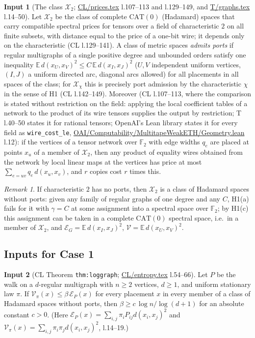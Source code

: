 \documentclass[11pt]{article}
\theoremstyle{definition}
\newtheorem{hyp}{Input}
\theoremstyle{remark}
\newtheorem{remark}[theorem]{Remark}
\newcommand{\F}{\mathbb F}
\newcommand{\E}{\mathbb E}
\newcommand{\X}{\mathcal X}
\newcommand{\src}[1]{\url{#1}}
\begin{document}
\begin{hyp}[The class $\X_2$; \src{CL/prices.tex} l.107--113 and l.129--149, and \src{T/graphs.tex} l.14--50]\label{H2}
Let $\X_2$ be the class of complete $\mathrm{CAT}(0)$ (Hadamard) spaces that carry compatible spectral prices for tensors over a
field of characteristic $2$ on all finite subsets, with distance equal to the price of a one-bit wire; it depends only on the
characteristic (CL l.129--141). A class of metric spaces \emph{admits ports} if regular multigraphs of a single positive degree
and unbounded orders satisfy one inequality $\E\,d(x_U,x_V)^2\le C\,\E\,d(x_I,x_J)^2$ ($U,V$ independent uniform vertices,
$(I,J)$ a uniform directed arc, diagonal arcs allowed) for all placements in all spaces of the class; for $\X_\chi$ this is
precisely port admission by the characteristic $\chi$ in the sense of H1 (CL l.142--149). Moreover (CL l.107--113, where
the comparison is stated without restriction on the field: applying the local coefficient tables of a network to the product of
its wire tensors supplies the output by restriction; T l.40--50 states it for rational tensors; OpenAI's Lean library states it
for every field as \texttt{wire\_cost\_le}, \src{OAI/Computability/MultitapeWeakETH/Geometry.lean} l.12): if the vertices of a
tensor network over $\F_2$ with edge widths $q_e$ are placed at
points $x_u$ of a member of $\X_2$, then any product of equality wires obtained from the network by local linear maps at the
vertices has price at most $\sum_{e=uv}q_e\,d(x_u,x_v)$, and $r$ copies cost $r$ times this.
\end{hyp}

\begin{remark}\label{rem:noports}
If characteristic $2$ has no ports, then $\X_2$ is a class of Hadamard spaces without ports: given any family of regular graphs
of one degree and any $C$, H1(a) fails for it with $\gamma=C$ at some assignment into a spectral space over $\F_2$; by H1(c)
this assignment can be taken in a complete $\mathrm{CAT}(0)$ spectral space, i.e.\ in a member of $\X_2$, and
$\mathcal E_G=\E\,d(x_I,x_J)^2$, $\mathcal V=\E\,d(x_U,x_V)^2$.
\end{remark}

\subsection{Inputs for Case 1}

\begin{hyp}[CL Theorem \texttt{thm:loggraph}; \src{CL/entropy.tex} l.54--66]\label{H3}
Let $P$ be the walk on a $d$-regular multigraph with $n\ge2$ vertices, $d\ge1$, and uniform stationary law $\pi$. If
$\mathcal V_\pi(x)\le\beta\,\mathcal E_P(x)$ for every placement $x$ in every member of a class of Hadamard spaces without ports,
then $\beta\ge c\,\log n/\log(d+1)$ for an absolute constant $c>0$. (Here $\mathcal E_P(x)=\sum_{i,j}\pi_iP_{ij}d(x_i,x_j)^2$
and $\mathcal V_\pi(x)=\sum_{i,j}\pi_i\pi_jd(x_i,x_j)^2$, l.14--19.)
\end{hyp}
\end{document}
